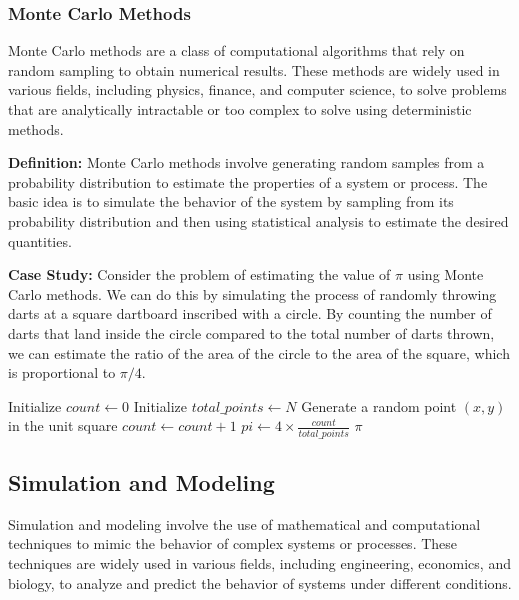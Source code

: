 \documentclass[12pt]{book} %
\begin{document}
\subsubsection{Monte Carlo Methods}

Monte Carlo methods are a class of computational algorithms that rely on random sampling to obtain numerical results. These methods are widely used in various fields, including physics, finance, and computer science, to solve problems that are analytically intractable or too complex to solve using deterministic methods.

\textbf{Definition:} Monte Carlo methods involve generating random samples from a probability distribution to estimate the properties of a system or process. The basic idea is to simulate the behavior of the system by sampling from its probability distribution and then using statistical analysis to estimate the desired quantities.

\textbf{Case Study:} Consider the problem of estimating the value of $\pi$ using Monte Carlo methods. We can do this by simulating the process of randomly throwing darts at a square dartboard inscribed with a circle. By counting the number of darts that land inside the circle compared to the total number of darts thrown, we can estimate the ratio of the area of the circle to the area of the square, which is proportional to $\pi/4$.
\FloatBarrier
\begin{algorithm}
\caption{Monte Carlo Estimation of $\pi$}
\begin{algorithmic}[1]
\State Initialize $count \leftarrow 0$
\State Initialize $total\_points \leftarrow N$
    \State Generate a random point $(x, y)$ in the unit square
        \State $count \leftarrow count + 1$
    \EndIf
\EndFor
\State $pi \leftarrow 4 \times \frac{count}{total\_points}$
\Return $\pi$
\end{algorithmic}
\end{algorithm}
\FloatBarrier

\subsection{Simulation and Modeling}

Simulation and modeling involve the use of mathematical and computational techniques to mimic the behavior of complex systems or processes. These techniques are widely used in various fields, including engineering, economics, and biology, to analyze and predict the behavior of systems under different conditions.
\end{document}
